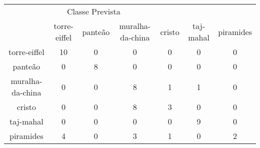 \begin{tabular}{|c|c|c|c|c|c|c|}
\hline
\multicolumn{5}{|c|}{Classe Prevista}\\
 & torre-eiffel & panteão & muralha-da-china & cristo & taj-mahal & piramides\\
torre-eiffel & 10 & 0 & 0 & 0 & 0 & 0\\
panteão & 0 & 8 & 0 & 0 & 0 & 0\\
muralha-da-china & 0 & 0 & 8 & 1 & 1 & 0\\
cristo & 0 & 0 & 8 & 3 & 0 & 0\\
taj-mahal & 0 & 0 & 0 & 0 & 9 & 0\\
piramides & 4 & 0 & 3 & 1 & 0 & 2\\
\end{tabular}
